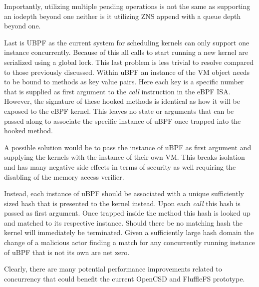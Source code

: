 
Importantly, utilizing multiple pending operations is not the same as supporting
an iodepth beyond one neither is it utilizing ZNS append with a queue depth
beyond one.

Last is UBPF as the current system for scheduling kernels can only support one
instance concurrently. Because of this all calls to start running a new kernel
are serialized using a global lock. This last problem is less trivial to resolve
compared to those previously discussed. Within uBPF an instance of the VM object
needs to be bound to methods as key value pairs. Here each key is a specific
number that is supplied as first argument to the \textit{call} instruction in
the eBPF ISA. However, the signature of these hooked methods is identical as how
it will be exposed to the eBPF kernel. This leaves no state or arguments that
can be passed along to associate the specific instance of uBPF once trapped into
the hooked method.


A possible solution would be to pass the instance of uBPF as first argument and
supplying the kernels with the instance of their own VM. This breaks isolation
and has many negative side effects in terms of security as well requiring the
disabling of the memory access verifier.

Instead, each instance of uBPF should be associated with a unique sufficiently
sized hash that is presented to the kernel instead. Upon each \textit{call} this
hash is passed as first argument. Once trapped inside the method this hash is
looked up and matched to its respective instance. Should there be no matching
hash the kernel will immediately be terminated. Given a sufficiently large
hash domain the change of a malicious actor finding a match for any concurrently
running instance of uBPF that is not its own are net zero.


Clearly, there are many potential performance improvements related to
concurrency that could benefit the current OpenCSD and FluffleFS prototype.

